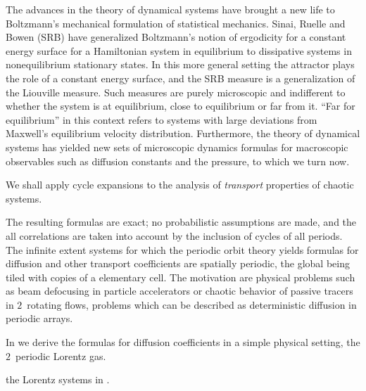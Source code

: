 


The advances
in the theory of dynamical systems have brought
a new life to Boltzmann's mechanical formulation of statistical
mechanics.
Sinai, Ruelle and Bowen (SRB) have generalized Boltzmann's notion
of ergodicity for a constant energy surface for a
Hamiltonian system in equilibrium to dissipative systems in
{nonequilibrium} stationary states. In this more general
setting the attractor plays the role of a constant energy surface,
and the SRB measure %
is a generalization of the Liouville measure. Such measures are
purely microscopic and indifferent to whether the system is at
equilibrium, close to equilibrium or far from it.
``Far for equilibrium'' in this context refers to systems with
large deviations from Maxwell's equilibrium velocity distribution.
Furthermore, the theory of dynamical systems has yielded new sets
of microscopic dynamics formulas for macroscopic observables such as
diffusion constants and the pressure, to which we turn now.

%
%
We shall apply cycle expansions to the analysis of {\em transport}
properties of chaotic systems.

The resulting formulas are exact; no probabilistic assumptions are made, and
the all correlations are taken into account by the inclusion of cycles of all
periods.
The infinite extent
systems for which the periodic orbit theory yields formulas for
diffusion and other transport coefficients are
spatially periodic, the global {\statesp} being tiled with copies
of a elementary cell.
The motivation are physical problems such as
beam defocusing in particle accelerators
or chaotic behavior of passive tracers in $2$\dmn\ rotating flows,
problems which can be described as
deterministic diffusion in periodic arrays.

In  we derive the formulas for diffusion
coefficients in a simple physical setting, the $2$\dmn\ periodic Lorentz
gas.

the Lorentz systems in .

